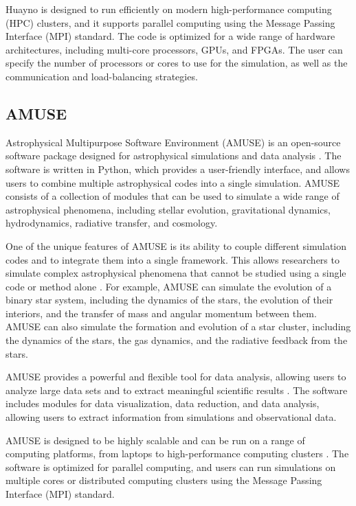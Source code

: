Huayno is designed to run efficiently on modern high-performance computing (HPC) clusters, and it supports parallel computing using the Message Passing Interface (MPI) standard. The code is optimized for a wide range of hardware architectures, including multi-core processors, GPUs, and FPGAs. The user can specify the number of processors or cores to use for the simulation, as well as the communication and load-balancing strategies.

\subsection{AMUSE}

Astrophysical Multipurpose Software Environment (AMUSE) is an open-source software package designed for astrophysical simulations and data analysis \citep{pelupessy2013astrophysical,portegies2018astrophysical}. The software is written in Python, which provides a user-friendly interface, and allows users to combine multiple astrophysical codes into a single simulation. AMUSE consists of a collection of modules that can be used to simulate a wide range of astrophysical phenomena, including stellar evolution, gravitational dynamics, hydrodynamics, radiative transfer, and cosmology.

One of the unique features of AMUSE is its ability to couple different simulation codes and to integrate them into a single framework. This allows researchers to simulate complex astrophysical phenomena that cannot be studied using a single code or method alone \citep{pelupessy2013astrophysical,portegies2018astrophysical}. For example, AMUSE can simulate the evolution of a binary star system, including the dynamics of the stars, the evolution of their interiors, and the transfer of mass and angular momentum between them. AMUSE can also simulate the formation and evolution of a star cluster, including the dynamics of the stars, the gas dynamics, and the radiative feedback from the stars.

AMUSE provides a powerful and flexible tool for data analysis, allowing users to analyze large data sets and to extract meaningful scientific results \citep{portegies2018astrophysical}. The software includes modules for data visualization, data reduction, and data analysis, allowing users to extract information from simulations and observational data.

AMUSE is designed to be highly scalable and can be run on a range of computing platforms, from laptops to high-performance computing clusters \citep{pelupessy2013astrophysical}. The software is optimized for parallel computing, and users can run simulations on multiple cores or distributed computing clusters using the Message Passing Interface (MPI) standard.


